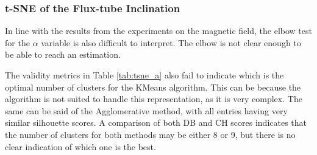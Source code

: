 \subsubsection{t-SNE of the Flux-tube Inclination}\label{sec:tsne_a}
In line with the results from the experiments on the magnetic field, the elbow test for the $\alpha$ variable is also difficult to interpret. The elbow is not clear enough to be able to reach an estimation.

The validity metrics in Table \ref{tab:tsne_a} also fail to indicate which is the optimal number of clusters for the KMeans algorithm. This can be because the algorithm is not suited to handle this representation, as it is very complex. The same can be said of the Agglomerative method, with all entries having very similar silhouette scores. A comparison of both DB and CH scores indicates that the number of clusters for both methods may be either 8 or 9, but there is no clear indication of which one is the best.

